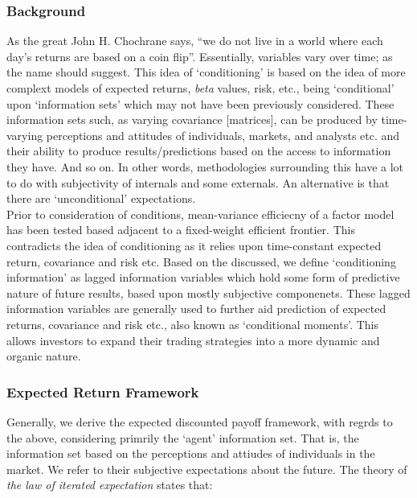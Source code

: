\documentclass[11pt, english]{article}
\begin{document}
		\subsubsection*{Background}

        As the great John H. Chochrane says, ``we do not live in a world where each day's returns are based on a coin flip''. Essentially, variables vary over time; as the name should suggest. This idea of `conditioning' is based on the idea of more complext models of expected returns, \textit{beta} values, risk, etc., being `conditional' upon `information sets' which may not have been previously considered. These information sets such, as varying covariance [matrices], can be produced by time-varying perceptions and attitudes of individuals, markets, and analysts etc. and their ability to produce results/predictions based on the access to information they have. And so on. In other words, methodologies surrounding this have a lot to do with subjectivity of internals and some externals. An alternative is that there are `unconditional' expectations.\\
        
        Prior to consideration of conditions, mean-variance efficiecny of a factor model has been tested based adjacent to a fixed-weight efficient frontier. This contradicts the idea of conditioning as it relies upon time-constant expected return, covariance and risk etc. Based on the discussed, we define `conditioning information' as lagged information variables which hold some form of predictive nature of future results, based upon mostly subjective componenets. These lagged information variables are generally used to further aid prediction of expected returns, covariance and risk etc., also known as `conditional moments'. This allows investors to expand their trading strategies into a more dynamic and organic nature. 

        \subsubsection*{Expected Return Framework}

        Generally, we derive the expected discounted payoff framework, with regrds to the above, considering primrily the `agent' information set. That is, the information set based on the perceptions and attiudes of individuals in the market. We refer to their subjective expectations about the future. The theory of \textit{the law of iterated expectation} states that:
\end{document}
